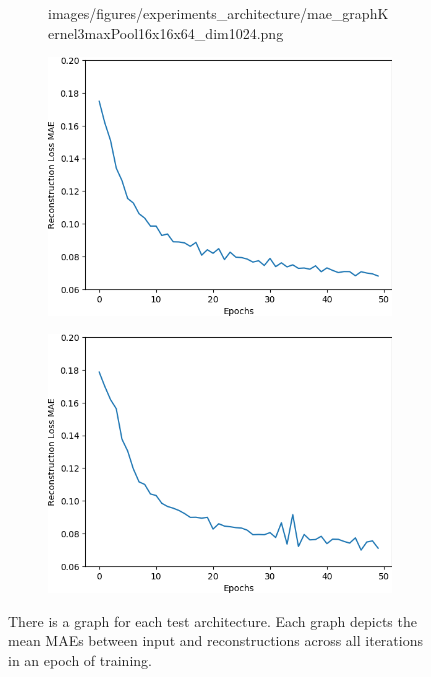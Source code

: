 \begin{figure}[H]
\begin{subfigure}{.25\textwidth}
        {images/figures/experiments_architecture/mae_graphKernel3maxPool16x16x64_dim1024.png}
        \caption{}
    \end{subfigure}%
    \begin{subfigure}{.25\textwidth}
        \centering
        \includegraphics[width=\textwidth]
        {images/figures/experiments_architecture/mae_graphKernel3avgPool16x16x32_dim1024.png}
        \caption{}
    \end{subfigure}%
    \begin{subfigure}{.25\textwidth}
        \centering
        \includegraphics[width=\textwidth]
        {images/figures/experiments_architecture/mae_graphKernel3avgPool16x16x64_dim1024.png}
        \caption{}
    \end{subfigure}
    \caption{There is a graph for each test architecture.
    Each graph depicts the mean MAEs between input and reconstructions across 
    all iterations in an epoch of training.} \label{figure_learning_curves4}
\end{figure} 

